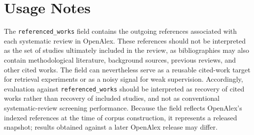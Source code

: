 \section*{Usage Notes}

The \texttt{referenced\_works} field contains the outgoing references associated with each systematic review in OpenAlex. These references should not be interpreted as the set of studies ultimately included in the review, as bibliographies may also contain methodological literature, background sources, previous reviews, and other cited works. The field can nevertheless serve as a reusable cited-work target for retrieval experiments or as a noisy signal for weak supervision. Accordingly, evaluation against \texttt{referenced\_works} should be interpreted as recovery of cited works rather than recovery of included studies, and not as conventional systematic-review screening performance. Because the field reflects OpenAlex's indexed references at the time of corpus construction, it represents a released snapshot; results obtained against a later OpenAlex release may differ.
